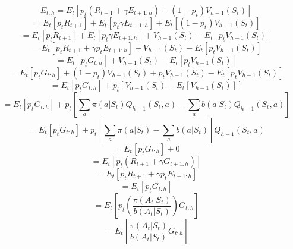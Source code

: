 \documentclass{article}
\begin{document}
\begin{equation}
    E_{t:h} = E_{t}[p_t(R_{t+1}+\gamma E_{t+1:h}) + (1-p_t) V_{h-1}(S_t)]
\end{equation}
\begin{equation}
    = E_{t}[p_t R_{t+1}] + E_{t}[p_t \gamma E_{t+1:h}] + E_{t}[(1-p_t)V_{h-1}(S_t)]
\end{equation}
\begin{equation}
    = E_{t}[p_t R_{t+1}] + E_{t}[p_t \gamma E_{t+1:h}] + V_{h-1}(S_t) - E_{t}[p_t V_{h-1}(S_t)]
\end{equation}
\begin{equation}
    = E_{t}[p_t R_{t+1} + \gamma p_t E_{t+1:h}] + V_{h-1}(S_t) - E_{t}[p_t V_{h-1}(S_t)]
\end{equation}
\begin{equation}
    = E_{t}[p_t G_{t:h}] + V_{h-1}(S_t) - E_{t}[p_t V_{h-1}(S_t)]
\end{equation}
\begin{equation}
    = E_{t}[p_t G_{t:h}] + (1-p_t)V_{h-1}(S_t) + p_t V_{h-1}(S_t) - E_{t}[p_t V_{h-1}(S_t)]
\end{equation}
\begin{equation}
    = E_{t}[p_t G_{t:h}] + p_t [V_{h-1}(S_t) - E_{t}[V_{h-1}(S_t)]]
\end{equation}
\begin{equation}
    = E_{t}[p_t G_{t:h}] + p_t [\sum_{a} \pi(a|S_t) Q_{h-1}(S_t, a) - \sum_{a} b(a|S_t) Q_{h-1}(S_t, a)]
\end{equation}
\begin{equation}
    = E_{t}[p_t G_{t:h}] + p_t [\sum_{a} \pi(a|S_t) - \sum_{a} b(a|S_t)] Q_{h-1}(S_t, a)
\end{equation}
\begin{equation}
    = E_{t}[p_t G_{t:h}] + 0
\end{equation}
\begin{equation}
    = E_{t}[p_t(R_{t+1}+\gamma G_{t+1:h})]
\end{equation}
\begin{equation}
    = E_{t}[p_t R_{t+1} + \gamma p_t E_{t+1:h}]
\end{equation}
\begin{equation}
    = E_{t}[p_t G_{t:h}]
\end{equation}
\begin{equation}
    = E_{t}[p_t(\frac{\pi(A_t|S_t)}{b(A_t|S_t)}) G_{t:h}]
\end{equation}
\begin{equation}
    = E_{t}[\frac{\pi(A_t|S_t)}{b(A_t|S_t)} G_{t:h}]
\end{equation}
\end{document}
